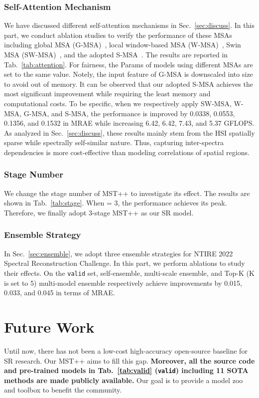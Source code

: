 \documentclass[10pt,twocolumn,letterpaper]{article}
\begin{document}
\subsubsection{Self-Attention Mechanism}
We have discussed different self-attention mechanisms in Sec.~\ref{sec:discuss}. In this part,  we conduct ablation studies to verify the performance of these MSAs including global MSA (G-MSA)~\cite{global_msa}, local window-based MSA (W-MSA)~\cite{liu2021swin}, Swin MSA (SW-MSA)~\cite{liu2021swin}, and the adopted S-MSA~\cite{mst}. The results are reported in Tab.~\ref{tab:attention}. For fairness, the Params of models using different MSAs are set to the same value. Notely, the input feature of G-MSA is downscaled  into  size to avoid out of memory.  It can be observed that our adopted S-MSA achieves the most significant improvement while requiring the least memory and computational costs. To be specific, when we respectively apply SW-MSA, W-MSA, G-MSA, and S-MSA, the performance is improved by 0.0338, 0.0553, 0.1356, and 0.1532 in MRAE while increasing 6.42, 6.42, 7.43, and 5.37 GFLOPS.  As analyzed in Sec.~\ref{sec:discuss}, these results mainly stem from the HSI spatially sparse while spectrally self-similar nature. Thus, capturing inter-spectra dependencies is more cost-effective than modeling correlations of spatial regions. 

\subsubsection{Stage Number}
We change the stage number  of MST++ to investigate its effect. The results are shown in Tab.~\ref{tab:stage}. When  = 3, the performance achieves its peak. Therefore, we finally adopt 3-stage MST++ as our SR model.


\subsubsection{Ensemble Strategy}
In Sec.~\ref{sec:ensemble}, we  adopt three ensemble strategies for NTIRE 2022 Spectral Reconstruction Challenge. In this part, we perform ablations to study their effects. On the \texttt{valid} set, self-ensemble, multi-scale ensemble, and Top-K (K is set to 5) multi-model ensemble respectively achieve improvements by 0.015, 0.033, and 0.045 in terms of MRAE. 

\section{Future Work}
Until now, there has not been a low-cost high-accuracy open-source baseline for SR research. Our MST++ aims to fill this gap. \textbf{Moreover, all the source code and pre-trained models in Tab.~\ref{tab:valid} (\texttt{valid}) including 11 SOTA methods are made publicly available.} Our goal is to provide a model zoo and toolbox to benefit the community.
\end{document}
